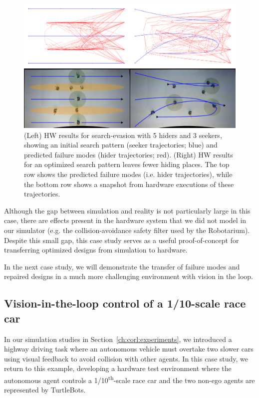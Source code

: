 \begin{figure}[tb]
    \centering
    \includegraphics[width=\linewidth]{images/corl/hw_results.png}
    \caption{(Left) HW results for search-evasion with 5 hiders and 3 seekers, showing an initial search pattern (seeker trajectories; blue) and predicted failure modes (hider trajectories; red). (Right) HW results for an optimized search pattern leaves fewer hiding places. The top row shows the predicted failure modes (i.e. hider trajectories), while the bottom row shows a snapshot from hardware executions of these trajectories.}
    \label{fig:hw_experimental_results}
\end{figure}

Although the gap between simulation and reality is not particularly large in this case, there are effects present in the hardware system that we did not model in our simulator (e.g. the collision-avoidance safety filter used by the Robotarium). Despite this small gap, this case study serves as a useful proof-of-concept for transferring optimized designs from simulation to hardware.

In the next case study, we will demonstrate the transfer of failure modes and repaired designs in a much more challenging environment with vision in the loop.

\subsection{Vision-in-the-loop control of a 1/10-scale race car}

In our simulation studies in Section~\ref{ch:corl:experiments}, we introduced a highway driving task where an autonomous vehicle must overtake two slower cars using visual feedback to avoid collision with other agents. In this case study, we return to this example, developing a hardware test environment where the autonomous agent controls a 1/10\textsuperscript{th}-scale race car and the two non-ego agents are represented by TurtleBots.

